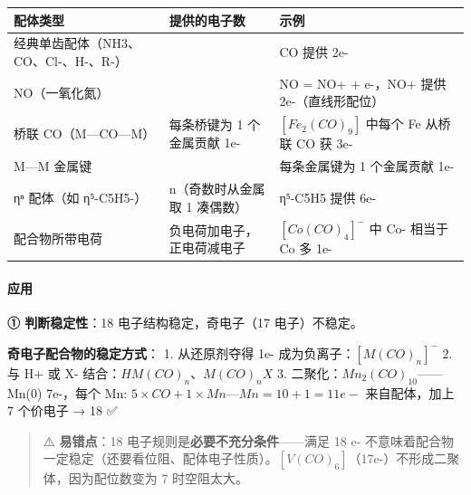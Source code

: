 \documentclass[a4paper,11pt]{ctexart}
\newcounter{none}
\begin{document}
{\def\LTcaptype{none} %
\begin{longtable}[]{@{}
  >{\raggedright\arraybackslash}p{}
  >{\centering\arraybackslash}p{}
  >{\raggedright\arraybackslash}p{}@{}}
\toprule\noalign{}
\begin{minipage}[b]{\linewidth}\raggedright
配体类型
\end{minipage} & \begin{minipage}[b]{\linewidth}\centering
提供的电子数
\end{minipage} & \begin{minipage}[b]{\linewidth}\raggedright
示例
\end{minipage} \\
\midrule\noalign{}
\endhead
\bottomrule\noalign{}
\endlastfoot
经典单齿配体（NH3、CO、Cl-、H-、R-） & 2 & CO 提供 2e- \\
NO（一氧化氮） & 3 & NO = NO+ + e-，NO+ 提供 2e-（直线形配位） \\
桥联 CO（M---CO---M） & 每条桥键为 1 个金属贡献 1e- & \([Fe_2(CO)_9]\) 中每个 Fe 从桥联 CO 获 3e- \\
M---M 金属键 & 1 & 每条金属键为 1 个金属贡献 1e- \\
ηⁿ 配体（如 η⁵-C5H5-） & n（奇数时从金属取 1 凑偶数） & η⁵-C5H5 提供 6e- \\
配合物所带电荷 & 负电荷加电子，正电荷减电子 & \([Co(CO)_4]^-\) 中 Co- 相当于 Co 多 1e- \\
\end{longtable}
}

\paragraph{应用}\label{ux5e94ux7528}

\textbf{① 判断稳定性}：18 电子结构稳定，奇电子（17 电子）不稳定。

\textbf{奇电子配合物的稳定方式}：
1. 从还原剂夺得 1e- 成为负离子：\([M(CO)_n]^-\)
2. 与 H+ 或 X- 结合：\(HM(CO)_n\)、\(M(CO)_nX\)
3. 二聚化：\(Mn_2(CO)_{10}\)------Mn(0) 7e-，每个 Mn: \(5 \times CO + 1 \times Mn—Mn = 10 + 1 = 11e-\) 来自配体，加上 7 个价电子 → 18 ✅

\begin{quote}
⚠️ \textbf{易错点}：18 电子规则是\textbf{必要不充分条件}------满足 18 e- 不意味着配合物一定稳定（还要看位阻、配体电子性质）。\([V(CO)_6]\)（17e-）不形成二聚体，因为配位数变为 7 时空阻太大。
\end{quote}
\end{document}
